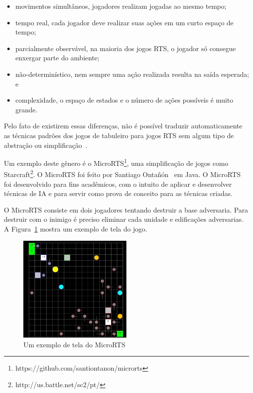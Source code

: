 \begin{itemize}
	\item movimentos simultâneos, jogadores realizam jogadas ao mesmo tempo;
	\item tempo real, cada jogador deve realizar suas ações em um curto espaço de tempo;
	\item parcialmente observável, na maioria dos jogos RTS, o jogador só consegue enxergar parte do ambiente;
	\item não-determinístico, nem sempre uma ação realizada resulta na saída esperada; e
	\item complexidade, o espaço de estados e o número de ações possíveis é muito grande.
\end{itemize} 

Pelo fato de existirem essas diferenças, não é possível traduzir automaticamente as técnicas padrões dos jogos de tabuleiro para jogos RTS sem algum tipo de abstração ou simplificação~\cite{ontanon2013survey}.

Um exemplo deste gênero é o MicroRTS\footnote{https://github.com/santiontanon/microrts}, uma simplificação de jogos como Starcraft\footnote{http://us.battle.net/sc2/pt/}. O MicroRTS foi feito por Santiago Ontañón~\cite{ontanon2013combinatorial} em Java. O MicroRTS foi desenvolvido para fins acadêmicos, com o intuito de aplicar e desenvolver técnicas de IA e para servir como prova de conceito para as técnicas criadas.

O MicroRTS consiste em dois jogadores tentando destruir a base adversaria. Para destruir com o inimigo é preciso eliminar cada unidade e edificações adversarias. A Figura~\ref{fig:microrts} mostra um exemplo de tela do jogo.

\begin{figure}[ht]
	\centering
	\includegraphics[width=0.5\textwidth]{fig/microrts.pdf}
	\caption{Um exemplo de tela do MicroRTS}
	\label{fig:microrts}
\end{figure} 

